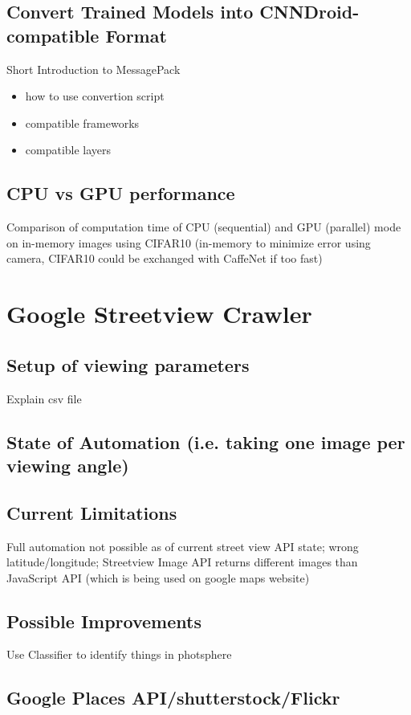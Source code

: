 \documentclass[a4paper,12pt,pagesize,headsepline,bibtotoc,titlepage]{scrartcl}
\begin{document}
\subsection{Convert Trained Models into CNNDroid-compatible Format}
Short Introduction to MessagePack
\begin{itemize}
    \item{how to use convertion script}
    \item{compatible frameworks}
    \item{compatible layers}
\end{itemize}

\subsection{CPU vs GPU performance}
Comparison of computation time of CPU (sequential) and GPU (parallel) mode on in-memory images using CIFAR10 (in-memory to minimize error using camera, CIFAR10 could be exchanged with CaffeNet if too fast)

\newpage
\section{Google Streetview Crawler}
\subsection{Setup of viewing parameters}
Explain csv file

\subsection{State of Automation (i.e. taking one image per viewing angle)}

\subsection{Current Limitations}
Full automation not possible as of current street view API state; wrong latitude/longitude; Streetview Image API returns different images than JavaScript API (which is being used on google maps website)

\subsection{Possible Improvements}
Use Classifier to identify things in photsphere

\subsection{Google Places API/shutterstock/Flickr}
\end{document}
